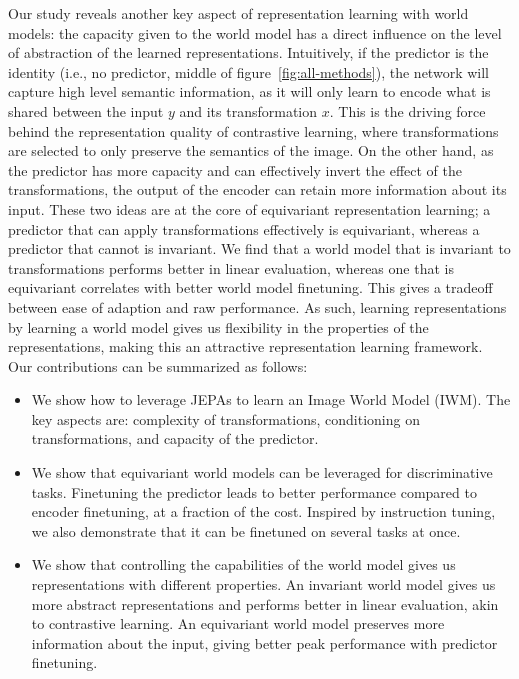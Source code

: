 \documentclass[twocolumn]{fairmeta}
\theoremstyle{plain}
\theoremstyle{definition}
\theoremstyle{remark}
\begin{document}
Our study reveals another key aspect of representation learning with world models: the capacity given to the world model has a direct influence on the level of abstraction of the learned representations.
Intuitively, if the predictor is the identity (i.e., no predictor, middle of figure~\ref{fig:all-methods}), the network will capture high level semantic information, as it will only learn to encode what is shared between the input $y$ and its transformation $x$.
This is the driving force behind the representation quality of contrastive learning, where transformations are selected to only preserve the semantics of the image.
On the other hand, as the predictor has more capacity and can effectively invert the effect of the transformations, the output of the encoder can retain more information about its input.
These two ideas are at the core of equivariant representation learning; a predictor that can apply transformations effectively is equivariant, whereas a predictor that cannot is invariant.
We find that a world model that is invariant to transformations performs better in linear evaluation, whereas one that is equivariant correlates with better world model finetuning.
This gives a tradeoff between ease of adaption and raw performance.
As such, learning representations by learning a world model gives us flexibility in the properties of the representations, making this an attractive representation learning framework.\\
Our contributions can be summarized as follows:
\begin{itemize}[noitemsep,nosep]
    \item We show how to leverage JEPAs to learn an Image World Model (IWM). The key aspects are: complexity of transformations, conditioning on transformations, and capacity of the predictor.
    \item We show that equivariant world models can be leveraged for discriminative tasks. Finetuning the predictor leads to better performance compared to encoder finetuning, at a fraction of the cost. Inspired by instruction tuning, we also demonstrate that it can be finetuned on several tasks at once.
    \item We show that controlling the capabilities of the world model gives us representations with different properties. An invariant world model gives us more abstract representations and performs better in linear evaluation, akin to contrastive learning. An equivariant world model preserves more information about the input, giving better peak performance with predictor finetuning.
\end{itemize}
\end{document}
